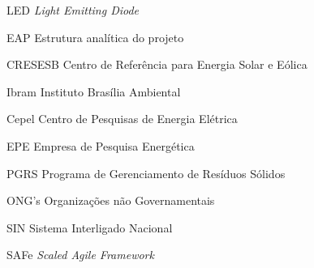\begin{siglas}
  \item[LED] \textit {Light Emitting Diode}
  \item[EAP] Estrutura anal\'itica do projeto
  \item[CRESESB] Centro de Refer\^encia para Energia Solar e E\'olica
  \item[Ibram] Instituto Bras\'ilia Ambiental
  \item[Cepel] Centro de Pesquisas de Energia El\'etrica
  \item[EPE] Empresa de Pesquisa Energ\'etica
  \item[PGRS] Programa de Gerenciamento de Res\'iduos S\'olidos
  \item[ONG's] Organiza\c{c}\~oes n\~ao Governamentais
  \item[SIN] Sistema Interligado Nacional
  \item[SAFe] \textit{Scaled Agile Framework}
\end{siglas}
